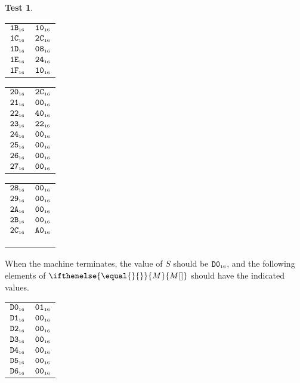 \documentclass[a4paper,12pt]{article}
\makeatletter
\newcommand{\num}[1]{\texttt{#1}}
\newcommand{\hex}[1]{\num{#1}_{\textup{\tiny 16}}}
\newcommand{\MEM}[1]{\ifthenelse{\equal{#1}{}}{M}{M[#1]}}
\newcommand{\SP}{S}
\theoremstyle{definition}
\newtheorem{test}{Test}
\newenvironment{memtable}{%
  \begin{trivlist}
    \item
    }{%
    \end{trivlist}}
\newenvironment{memcolumn}{%
  \begin{tabular}{@{}ll@{}}
    \hline}
    {%
    \hline
  \end{tabular}}
\newcommand{\memspace}{\qquad}
\makeatother
\begin{document}
\begin{test}
\begin{memtable}
\begin{memcolumn}
      $\hex{1B}$ & $\hex{10}$ \\
      $\hex{1C}$ & $\hex{2C}$ \\
      $\hex{1D}$ & $\hex{08}$ \\
      $\hex{1E}$ & $\hex{24}$ \\
      $\hex{1F}$ & $\hex{10}$ \\
    \end{memcolumn}
    \memspace
    \begin{memcolumn}
      $\hex{20}$ & $\hex{2C}$ \\
      $\hex{21}$ & $\hex{00}$ \\
      $\hex{22}$ & $\hex{40}$ \\
      $\hex{23}$ & $\hex{22}$ \\
      $\hex{24}$ & $\hex{00}$ \\
      $\hex{25}$ & $\hex{00}$ \\
      $\hex{26}$ & $\hex{00}$ \\
      $\hex{27}$ & $\hex{00}$ \\
    \end{memcolumn}
    \memspace
    \begin{memcolumn}
      $\hex{28}$ & $\hex{00}$ \\
      $\hex{29}$ & $\hex{00}$ \\
      $\hex{2A}$ & $\hex{00}$ \\
      $\hex{2B}$ & $\hex{00}$ \\
      $\hex{2C}$ & $\hex{A0}$ \\
      \\
      \\
      \\
    \end{memcolumn}
  \end{memtable}
  When the machine terminates, the value of $\SP$ should be $\hex{D0}$, and the following elements of $\MEM{}$ should have the indicated values.
  \begin{memtable}
    \begin{memcolumn}
      $\hex{D0}$ & $\hex{01}$ \\
      $\hex{D1}$ & $\hex{00}$ \\
      $\hex{D2}$ & $\hex{00}$ \\
      $\hex{D3}$ & $\hex{00}$ \\
      $\hex{D4}$ & $\hex{00}$ \\
      $\hex{D5}$ & $\hex{00}$ \\
      $\hex{D6}$ & $\hex{00}$ \\

\end{memcolumn}
\end{memtable}
\end{test}
\end{document}
